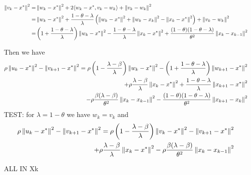 \documentclass[english,12pt,a4paper]{article}
\begin{document}
%
\begin{align*}
\left\|v_k -x^*\right\|^2 =& \left\|w_k -x^*\right\|^2 + 2\langle w_k-x^*,v_k-w_{k}\rangle + \left\|v_k-w_{k}\right\|^2\\
=& \left\|w_k -x^*\right\|^2 + \frac{1-\theta-\lambda}{\lambda}\left( \left\|w_k-x^*\right\|^2 + \left\|w_k-x_{k}\right\|^2 -\left\|x_k-x^*\right\|^2 \right) + \left\|v_k-w_{k}\right\|^2\\
=& \left(1 + \frac{1-\theta-\lambda}{\lambda}\right)\left\|w_k -x^*\right\|^2 - \frac{1-\theta-\lambda}{\lambda}\left\|x_k-x^*\right\|^2+  \frac{(1-\theta)(1-\theta-\lambda)}{\theta^2} \left\|x_k-x_{k-1}\right\|^2
\end{align*}
%

Then we have
%
\begin{align*}
\rho\left\|u_k -x^*\right\|^2 - \left\|v_{k+1} -x^*\right\|^2 = \rho\left(1-\frac{\lambda-\beta}{\lambda}\right)\left\|w_k -x^*\right\|^2-\left(1 + \frac{1-\theta-\lambda}{\lambda}\right)\left\|w_{k+1} -x^*\right\|^2\\
+\rho\frac{\lambda-\beta}{\lambda}\left\|x_k-x^*\right\|^2 + \frac{1-\theta-\lambda}{\lambda}\left\|x_{k+1}-x^*\right\|^2\\
- \rho\frac{\beta(\lambda-\beta)}{\theta^2}\left\|x_k-x_{k-1}\right\|^2-\frac{(1-\theta)(1-\theta-\lambda)}{\theta^2} \left\|x_{k+1}-x_k\right\|^2
\end{align*}
%
TEST: for $\lambda=1-\theta$ we have $w_k=v_k$ and
%
\begin{align*}
\rho\left\|u_k -x^*\right\|^2 - \left\|v_{k+1} -x^*\right\|^2 = \rho\left(1-\frac{\lambda-\beta}{\lambda}\right)\left\|v_k -x^*\right\|^2-\left\|v_{k+1} -x^*\right\|^2\\
+\rho\frac{\lambda-\beta}{\lambda}\left\|x_k-x^*\right\|^2
- \rho\frac{\beta(\lambda-\beta)}{\theta^2}\left\|x_k-x_{k-1}\right\|^2
\end{align*}
%










\dotfill ALL IN Xk \dotfill
\end{document}
